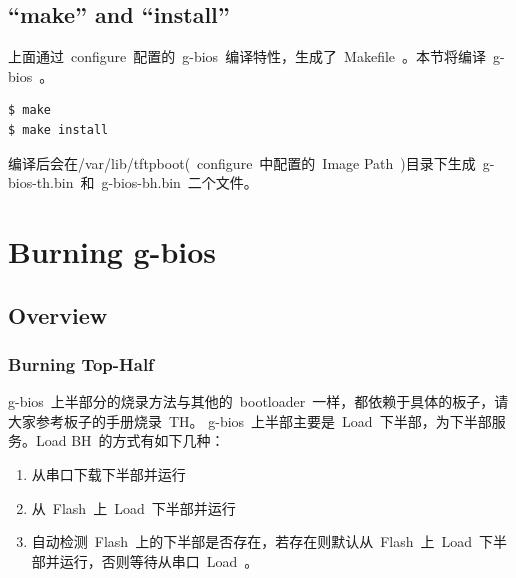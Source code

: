 \documentclass[a4paper,11pt]{book}
\begin{document}
\begin{CJK*}{UTF8}{gbsn}
\section{``make'' and ``install''}
上面通过~configure~配置的~g-bios~编译特性，生成了~Makefile~。本节将编译~g-bios~。
\begin{lstlisting}[language=bash,numbers=none]
$ make
$ make install
\end{lstlisting}
编译后会在/var/lib/tftpboot(~configure~中配置的~Image Path~)目录下生成~g-bios-th.bin~和~g-bios-bh.bin~二个文件。

\chapter{Burning g-bios}

\section{Overview}
\subsection{Burning Top-Half}
g-bios~上半部分的烧录方法与其他的~bootloader~一样，都依赖于具体的板子，请大家参考板子的手册烧录~TH。
g-bios~上半部主要是~Load~下半部，为下半部服务。Load BH~的方式有如下几种：
\begin{enumerate} \setlength{\itemsep}{-\itemsep}
\item 从串口下载下半部并运行
\item 从~Flash~上~Load~下半部并运行
\item 自动检测~Flash~上的下半部是否存在，若存在则默认从~Flash~上~Load~下半部并运行，否则等待从串口~Load~。
\end{enumerate}


\end{CJK*}
\end{document}
